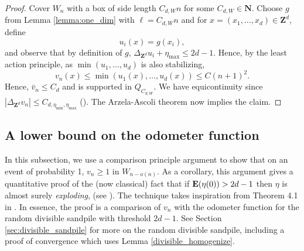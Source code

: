 \documentclass[12pt]{amsart}
\newcommand{\Z}{\mathbf{Z}}
\newcommand{\N}{\mathbf{N}}
\newcommand{\E}{\mathop{\bf E{}}}
\begin{document}
\begin{proof}

Cover $W_n$ with a box of side length $C_{d, W} n$ for some $C_{d, W} \in \N$. Choose $g$ from Lemma \ref{lemma:one_dim} with $\ell = C_{d, W} n$ and 
for $x = (x_1, \ldots, x_d) \in \Z^d$, define 
\[
u_i(x) = g(x_i), 
\]
and observe that by definition of $g$, $\Delta_{\Z^d} u_i+ \eta_{\max} \leq 2 d -1$.  Hence, by the least action principle, as $\min(u_1, \ldots, u_d)$ is also stabilizing, 
\[
v_n(x) \leq \min(u_1(x), \ldots, u_d(x)) \leq C (n+1)^2. %
\]
Hence, $\bar{v}_n \leq C_d$ and is supported in $Q_{C_{d,W}}$.  We have equicontinuity since $|\Delta_{\Z^d} v_n| \leq C_{d, \eta_{\min}, \eta_{\max}}$ (\cite{kuo2005estimates}). 
The Arzela-Ascoli theorem now implies the claim. 
\end{proof} 



\subsection{A lower bound on the odometer function}
In this subsection, we use a comparison principle argument to show that on an event of probability 1,  $v_n \geq 1$ in $W_{n - o(n)}$.
As a corollary, this argument gives a quantitative proof of the (now classical) fact that if $\E(\eta(0)) > 2 d -1$ then $\eta$ is almost surely {\it exploding}, (see \cite{fey2009stabilizability}). 
The technique takes inspiration from Theorem 4.1 in \cite{levine2009strong}. In essence, the proof is a comparison of $v_n$ with the odometer function for the random divisible sandpile with threshold $2 d-1$. See Section \ref{sec:divisible_sandpile} for more on the random divisible sandpile, including a proof of convergence which uses 
Lemma \ref{divisible_homogenize}. 
\end{document}

